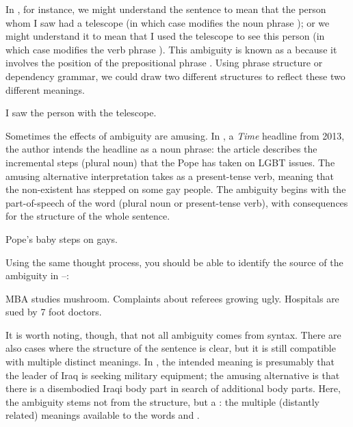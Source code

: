 In , for instance, we might understand the sentence to mean that the person whom I saw had a telescope (in which case  modifies the noun phrase ); or we might understand it to mean that I used the telescope to see this person (in which case  modifies the verb phrase ).  This ambiguity is known as a  because it involves the position of the prepositional phrase . Using phrase structure or dependency grammar, we could draw two different structures to reflect these two different meanings.

\ea \label{ex:telescope} I saw the person with the telescope.
\z 

Sometimes the effects of ambiguity are amusing. In , a \textit{Time} headline from 2013, the author intends the headline as a noun phrase: the article describes the incremental steps (plural noun) that the Pope has taken on LGBT issues.  The amusing alternative interpretation takes  as a present-tense verb, meaning that the non-existent  has stepped on some gay people.  The ambiguity begins with the part-of-speech of the word  (plural noun or present-tense verb), with consequences for the structure of the whole sentence.


\ea \label{ex:baby} Pope's baby steps on gays.
\z 

Using the same thought process, you should be able to identify the source of the ambiguity in  --:

\ea \ea \label{ex:mushroom} MBA studies mushroom.
   \ex \label{ex:ugly} Complaints about referees growing ugly.
    \ex \label{ex:foot} Hospitals are sued by 7 foot doctors.
\z 
\z 

It is worth noting, though, that not all ambiguity comes from syntax.  There are also cases where the structure of the sentence is clear, but it is still compatible with multiple distinct meanings.  In  , the intended meaning is presumably that the leader of Iraq is seeking military equipment; the amusing alternative is that there is a disembodied Iraqi body part in search of additional body parts.  Here, the ambiguity stems not from the structure, but a : the multiple (distantly related) meanings available to the words  and .


